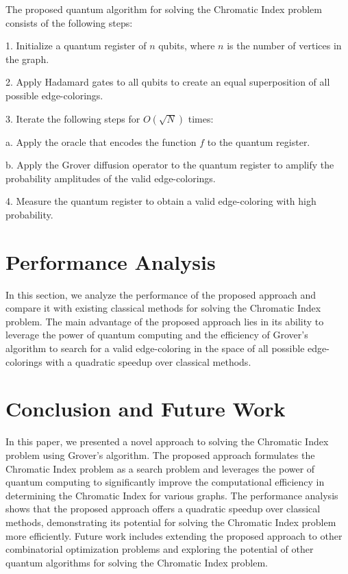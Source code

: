 The proposed quantum algorithm for solving the Chromatic Index problem consists of the following steps:

1. Initialize a quantum register of $n$ qubits, where $n$ is the number of vertices in the graph.

2. Apply Hadamard gates to all qubits to create an equal superposition of all possible edge-colorings.

3. Iterate the following steps for $O(\sqrt{N})$ times:

  a. Apply the oracle that encodes the function $f$ to the quantum register.

  b. Apply the Grover diffusion operator to the quantum register to amplify the probability amplitudes of the valid edge-colorings.

4. Measure the quantum register to obtain a valid edge-coloring with high probability.

\section{Performance Analysis}

In this section, we analyze the performance of the proposed approach and compare it with existing classical methods for solving the Chromatic Index problem. The main advantage of the proposed approach lies in its ability to leverage the power of quantum computing and the efficiency of Grover's algorithm to search for a valid edge-coloring in the space of all possible edge-colorings with a quadratic speedup over classical methods.

\section{Conclusion and Future Work}

In this paper, we presented a novel approach to solving the Chromatic Index problem using Grover's algorithm. The proposed approach formulates the Chromatic Index problem as a search problem and leverages the power of quantum computing to significantly improve the computational efficiency in determining the Chromatic Index for various graphs. The performance analysis shows that the proposed approach offers a quadratic speedup over classical methods, demonstrating its potential for solving the Chromatic Index problem more efficiently. Future work includes extending the proposed approach to other combinatorial optimization problems and exploring the potential of other quantum algorithms for solving the Chromatic Index problem.

